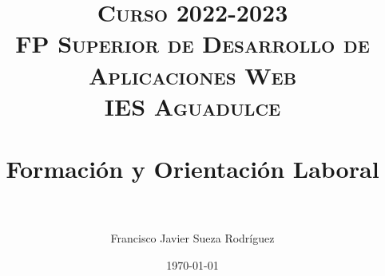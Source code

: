 


\title{	
\normalfont \normalsize 
\textsc{{\bfseries Curso 2022-2023} \\ FP Superior de Desarrollo de Aplicaciones Web \\ IES Aguadulce} \\ [25pt] 
\horrule{0.5pt} \\[0.4cm] 
\huge Formación y Orientación Laboral \\ 
\horrule{0.5pt} \\[0.4cm] 
}

\author{Francisco Javier Sueza Rodríguez} 
\date{\normalsize\today} 




\maketitle

\newpage 

\tableofcontents 



\newpage

 
 
 
  
 

